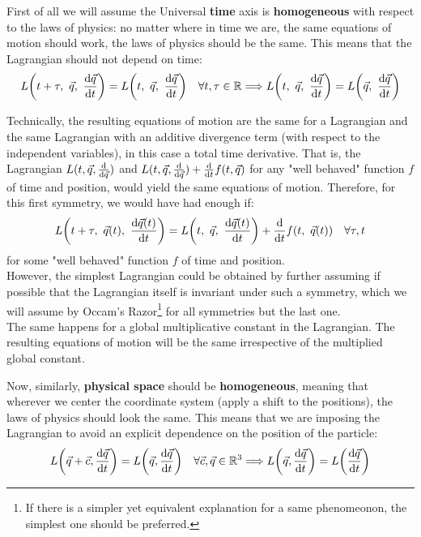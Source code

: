 \documentclass[11pt, a4paper]{article} %
\newcommand{\R}{\mathbb{R}} %
\DeclareRobustCommand{\mybox}[2][gray!10]{%
\begin{tcolorbox}[   %
        left=0.2cm,
        right=0.2cm,
        top=0.15cm,
        bottom=0.15cm,
        colback=#1,
        colframe=#1,
        width=\dimexpr\textwidth\relax, 
        enlarge left by=0mm,
        boxsep=5pt,
        arc=0pt,outer arc=0pt,
        ]
        #2
\end{tcolorbox}
}
\begin{document}
First of all we will assume the Universal {\bf time} axis is {\bf homogeneous} with respect to the laws of physics: no matter where in time we are, the same equations of motion should work, the laws of physics should be the same. This means that the Lagrangian should not depend on time:
\begin{equation}
L\qty(t+\tau,\ \vec{q},\ \dv{\vec{q}}{t})=L\qty(t,\ \vec{q},\ \dv{\vec{q}}{t})\quad \forall t,\tau\in \R \Longrightarrow L\qty(t,\ \vec{q},\ \dv{\vec{q}}{t})=L\qty(\vec{q},\ \dv{\vec{q}}{t})
\end{equation}
\mybox{
Technically, the resulting equations of motion are the same for a Lagrangian and the same Lagrangian with an additive divergence term (with respect to the independent variables), in this case a total time derivative. That is, the Lagrangian $L(t, \vec{q}, \dv{\vec{q}})$ and $L(t, \vec{q}, \dv{\vec{q}})+\dv{}{t}f(t,\vec{q})$ for any "well behaved" function $f$ of time and position, would yield the same equations of motion. Therefore, for this first symmetry, we would have had enough if:
\begin{equation}
L\qty(t+\tau,\ \vec{q}(t),\  \dv{\vec{q}(t)}{t})=L\qty(t,\  \vec{q},\  \dv{\vec{q}(t)}{t})+\dv{}{t}f(t,\ \vec{q}(t))\quad \forall \tau,t
\end{equation}
for some "well behaved" function $f$ of time and position.\\

However, the simplest Lagrangian could be obtained by further assuming if possible that the Lagrangian itself is invariant under such a symmetry, which we will assume by Occam's Razor\footnote{If there is a simpler yet equivalent explanation for a same phenomeonon, the simplest one should be preferred.} for all symmetries but the last one.\\

The same happens for a global multiplicative constant in the Lagrangian. The resulting equations of motion will be the same irrespective of the multiplied global constant.


}
Now, similarly, {\bf physical space} should be {\bf homogeneous}, meaning that wherever we center the coordinate system (apply a shift to the positions), the laws of physics should look the same. This means that we are imposing the Lagrangian to avoid an explicit dependence on the position of the particle:
\begin{equation}
L\qty( \vec{q}+\vec{c}, \dv{\vec{q}}{t})=L\qty( \vec{q}, \dv{\vec{q}}{t})\quad \forall \vec{c},\vec{q}\in \R^3 \Longrightarrow L\qty( \vec{q}, \dv{\vec{q}}{t})=L\qty( \dv{\vec{q}}{t})
\end{equation}
\end{document}
